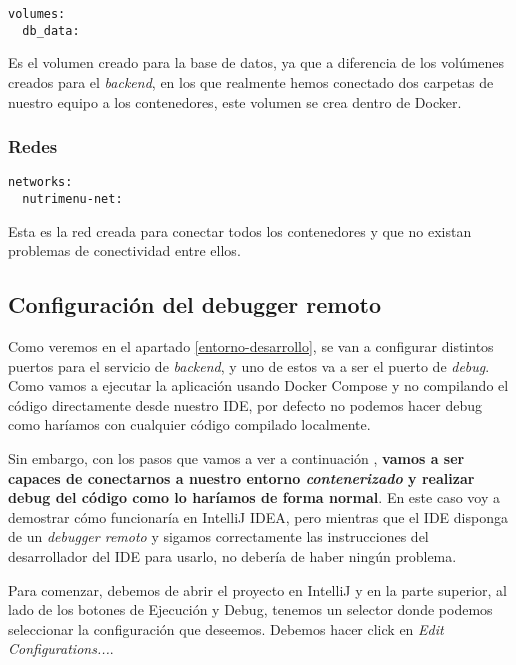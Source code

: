 \begin{lstlisting}
volumes:
  db_data:
\end{lstlisting}

Es el volumen creado para la base de datos, ya que a diferencia de los volúmenes creados para el \textit{backend}, en los que realmente hemos conectado dos carpetas de nuestro equipo a los contenedores, este volumen se crea dentro de Docker.

\subsubsection{Redes}

\begin{lstlisting}
networks:
  nutrimenu-net:
\end{lstlisting}

Esta es la red creada para conectar todos los contenedores y que no existan problemas de conectividad entre ellos.

\subsection{Configuración del debugger remoto}

Como veremos en el apartado \ref{entorno-desarrollo}, se van a configurar distintos puertos para el servicio de \textit{backend}, y uno de estos va a ser el puerto de \textit{debug}. Como vamos a ejecutar la aplicación usando Docker Compose y no compilando el código directamente desde nuestro IDE, por defecto no podemos hacer debug como haríamos con cualquier código compilado localmente. 

Sin embargo, con los pasos que vamos a ver a continuación \cite{medium:spring-boot-in-docker}, \textbf{vamos a ser capaces de conectarnos a nuestro entorno \textit{contenerizado} y realizar debug del código como lo haríamos de forma normal}. En este caso voy a demostrar cómo funcionaría en IntelliJ IDEA, pero mientras que el IDE disponga de un \textit{debugger remoto} y sigamos correctamente las instrucciones del desarrollador del IDE para usarlo, no debería de haber ningún problema.


Para comenzar, debemos de abrir  el proyecto en IntelliJ y en la parte superior, al lado de los botones de Ejecución y Debug, tenemos un selector donde podemos seleccionar la configuración que deseemos. Debemos hacer click en \textit{Edit Configurations...}.

